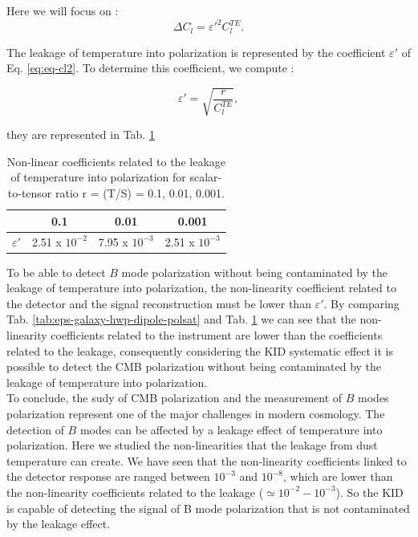 Here we will focus on : 
\begin{equation}
\Delta C_{l} = \varepsilon'^{2} C_{l}^{TE}.
\label{eq:eq-cl2}
\end{equation}

The leakage of temperature into polarization is represented by the coefficient $\varepsilon'$ of Eq. \ref{eq:eq-cl2}. To determine this coefficient, we compute :

\begin{equation}
\varepsilon' = \sqrt{\dfrac{r}{C_{l}^{TE}}},
\label{eq:eq-cl3}
\end{equation}

they are represented in Tab. \ref{tab:eps-lkg}

\begin{table}[h!]
\center
	\begin{tabular}{|c|c|c|c|}
  	\hline
 	\backslashbox{$\varepsilon'$}{$r$} & 0.1 & 0.01 & 0.001 \\
	\hline
	$\varepsilon'$ & 2.51 x $10^{-2}$ & 7.95 x $10^{-3}$ & 2.51 x $10^{-3}$\\
  	\hline
	\end{tabular} 
\caption{Non-linear coefficients related to the leakage of temperature into polarization for scalar-to-tensor ratio r = (T/S) = 0.1, 0.01, 0.001.}
\label{tab:eps-lkg}
\end{table}

To be able to detect $B$ mode polarization without being contaminated by the leakage of temperature into polarization, the non-linearity coefficient related to the detector and the signal reconstruction must be lower than $\varepsilon'$. 
By comparing Tab. \ref{tab:eps-galaxy-hwp-dipole-polsat} and Tab. \ref{tab:eps-lkg} we can see that the non-linearity coefficients related to the instrument are lower than the coefficients related to the leakage, consequently considering the KID systematic effect it is possible to detect the CMB polarization without being contaminated by the leakage of temperature into polarization.\\

To conclude, the sudy of CMB polarization and the measurement of $B$ modes polarization represent one of the major challenges in modern cosmology. The detection of $B$ modes can be affected by a leakage effect of temperature into polarization. Here we studied the non-linearities that the leakage from dust temperature can create. We have seen that the non-linearity coefficients linked to the detector response are ranged between $10^{-3}$ and $10^{-8}$, which are lower than the non-linearity coefficients related to the leakage ($\simeq 10^{-2} - 10^{-3}$). So the KID is capable of detecting the signal of B mode polarization that is not contaminated by the leakage effect.

